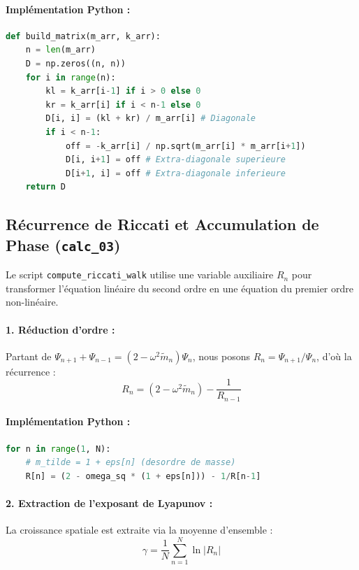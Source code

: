 \paragraph{Implémentation Python :}
\begin{lstlisting}[language=Python, caption={Construction de la matrice dynamique symétrisée}]
def build_matrix(m_arr, k_arr):
    n = len(m_arr)
    D = np.zeros((n, n))
    for i in range(n):
        kl = k_arr[i-1] if i > 0 else 0
        kr = k_arr[i] if i < n-1 else 0
        D[i, i] = (kl + kr) / m_arr[i] # Diagonale
        if i < n-1:
            off = -k_arr[i] / np.sqrt(m_arr[i] * m_arr[i+1])
            D[i, i+1] = off # Extra-diagonale superieure
            D[i+1, i] = off # Extra-diagonale inferieure
    return D
\end{lstlisting}

\subsection{Récurrence de Riccati et Accumulation de Phase (\texttt{calc\_03})}

Le script \texttt{compute\_riccati\_walk} utilise une variable auxiliaire $R_n$ pour transformer l'équation linéaire du second ordre en une équation du premier ordre non-linéaire.

\paragraph{1. Réduction d'ordre :}
Partant de $\Psi_{n+1} + \Psi_{n-1} = (2 - \omega^2 \tilde{m}_n) \Psi_n$, nous posons $R_n = \Psi_{n+1}/\Psi_n$, d'où la récurrence :
\begin{equation*}
    R_n = (2 - \omega^2 \tilde{m}_n) - \frac{1}{R_{n-1}}
\end{equation*}

\paragraph{Implémentation Python :}
\begin{lstlisting}[language=Python, caption={Boucle de récurrence de Riccati stochastique}]
for n in range(1, N):
    # m_tilde = 1 + eps[n] (desordre de masse)
    R[n] = (2 - omega_sq * (1 + eps[n])) - 1/R[n-1]
\end{lstlisting}

\paragraph{2. Extraction de l'exposant de Lyapunov :}
La croissance spatiale est extraite via la moyenne d'ensemble :
\begin{equation*}
    \gamma = \frac{1}{N} \sum_{n=1}^N \ln |R_n|
\end{equation*}

